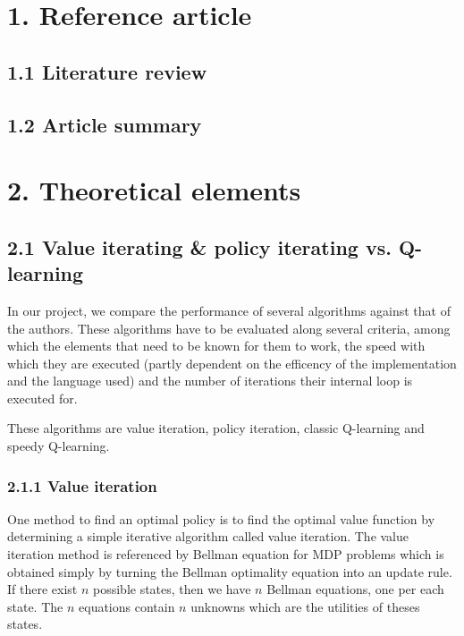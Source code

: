 \documentclass[a4paper, 12pt]{report}
\begin{document}
\chapter*{1. Reference article}

\section*{1.1 Literature review}

\section*{1.2 Article summary}

\chapter*{2. Theoretical elements}

\section*{2.1 Value iterating \& policy iterating vs. Q-learning}

In our project, we compare the performance of several algorithms against that of the authors.
These algorithms have to be evaluated along several criteria, among which the elements that need to be known
for them to work, the speed with which they are executed (partly dependent on the efficency of the implementation and the language used)
and the number of iterations their internal loop is executed for.

These algorithms are value iteration, policy iteration, classic Q-learning and speedy Q-learning.

\subsection*{2.1.1 Value iteration}

One method to find an optimal policy is to find the optimal value function by determining a simple iterative algorithm called value iteration.
The value iteration method is referenced by Bellman equation for MDP problems which is obtained simply by turning the Bellman optimality equation into an update rule.
If there exist $n$ possible states, then we have $n$ Bellman equations, one per each state.
The $n$ equations contain $n$ unknowns which are the utilities of theses states. 
\end{document}
